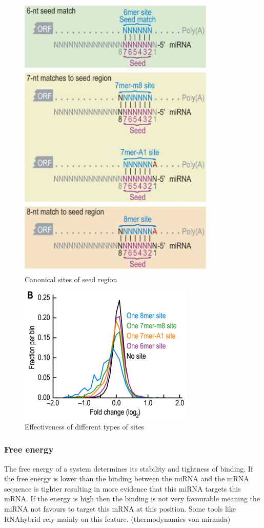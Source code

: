 \documentclass[12pt]{article}
\begin{document}
\begin{figure}[h]
\centering
\includegraphics[scale=0.6]{results/canonical_sites.png}
\caption{Canonical sites of seed region}
\label{Fig:canonical}
\end{figure}


\begin{figure}[h]
\centering
\includegraphics[scale=0.6]{results/site_3addi.png}
\caption{Effectiveness of different types of sites}
\label{types}
\end{figure}

\subsubsection{Free energy}
The free energy of a system determines its stability and tightness of binding. If the free energy is lower than the binding between the miRNA and the mRNA sequence is tighter resulting in more evidence that this miRNA targets this mRNA. If the energy is high then the binding is not very favourable meaning the miRNA not favours to target this mRNA at this position. Some tools like RNAhybrid \cite{Rehmsmeier} rely mainly on this feature. (thermodynamics von miranda)
 
\end{document}
